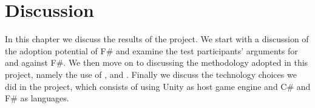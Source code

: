 \chapter{Discussion}
In this chapter we discuss the results of the project. We start with a discussion of the adoption potential of F\# and examine the test participants' arguments for and against F\#. We then move on to discussing the methodology adopted in this project, namely the use of \champagne, \attention and \cognitive. Finally we discuss the technology choices we did in the project, which consists of using Unity as host game engine and C\# and F\# as languages.





